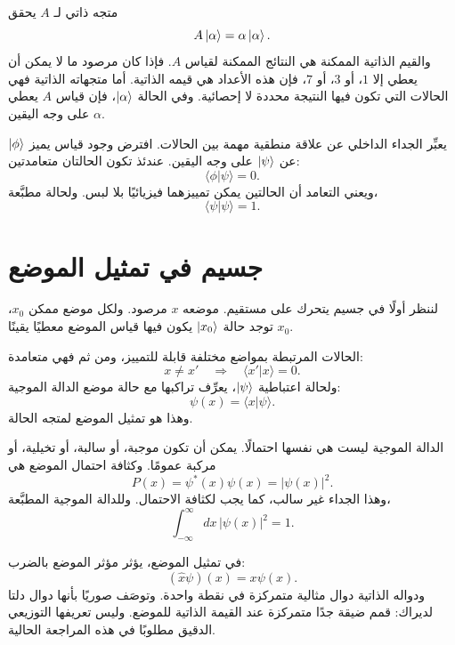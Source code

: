 متجه ذاتي لـ \(A\) يحقق
\begin{equation}
A\left\lvert\alpha\right\rangle=\alpha\left\lvert\alpha\right\rangle.
\end{equation}
والقيم الذاتية الممكنة هي النتائج الممكنة لقياس \(A\). فإذا كان مرصود ما لا يمكن أن يعطي إلا \(1\)، أو \(3\)، أو \(7\)، فإن هذه الأعداد هي قيمه الذاتية. أما متجهاته الذاتية فهي الحالات التي تكون فيها النتيجة محددة لا إحصائية. وفي الحالة \(\left\lvert\alpha\right\rangle\)، فإن قياس \(A\) يعطي \(\alpha\) على وجه اليقين.

يعبِّر الجداء الداخلي عن علاقة منطقية مهمة بين الحالات. افترض وجود قياس يميز \(\left\lvert\phi\right\rangle\) عن \(\left\lvert\psi\right\rangle\) على وجه اليقين. عندئذ تكون الحالتان متعامدتين:
\begin{equation}
\langle\phi|\psi\rangle=0.
\end{equation}
ويعني التعامد أن الحالتين يمكن تمييزهما فيزيائيًا بلا لبس. ولحالة مطبَّعة،
\begin{equation}
\langle\psi|\psi\rangle=1.
\end{equation}

\section{جسيم في تمثيل الموضع}

لننظر أولًا في جسيم يتحرك على مستقيم. موضعه \(x\) مرصود. ولكل موضع ممكن \(x_0\)، توجد حالة \(\left\lvert x_0\right\rangle\) يكون فيها قياس الموضع معطيًا يقينًا \(x_0\).

الحالات المرتبطة بمواضع مختلفة قابلة للتمييز، ومن ثم فهي متعامدة:
\begin{equation}
x\neq x'
\quad\Longrightarrow\quad
\langle x'|x\rangle=0.
\end{equation}
ولحالة اعتباطية \(\left\lvert\psi\right\rangle\)، يعرِّف تراكبها مع حالة موضع الدالة الموجية:
\begin{equation}
\psi(x)=\langle x|\psi\rangle.
\end{equation}
وهذا هو تمثيل الموضع لمتجه الحالة.

الدالة الموجية ليست هي نفسها احتمالًا. يمكن أن تكون موجبة، أو سالبة، أو تخيلية، أو مركبة عمومًا. وكثافة احتمال الموضع هي
\begin{equation}
P(x)=\psi^*(x)\psi(x)=|\psi(x)|^2.
\end{equation}
وهذا الجداء غير سالب، كما يجب لكثافة الاحتمال. وللدالة الموجية المطبَّعة،
\begin{equation}
\int_{-\infty}^{\infty}dx\,|\psi(x)|^2=1.
\end{equation}

في تمثيل الموضع، يؤثر مؤثر الموضع بالضرب:
\begin{equation}
(\hat x\psi)(x)=x\psi(x).
\end{equation}
ودواله الذاتية دوال مثالية متمركزة في نقطة واحدة. وتوصَف صوريًا بأنها دوال دلتا لديراك: قمم ضيقة جدًا متمركزة عند القيمة الذاتية للموضع. وليس تعريفها التوزيعي الدقيق مطلوبًا في هذه المراجعة الحالية.

